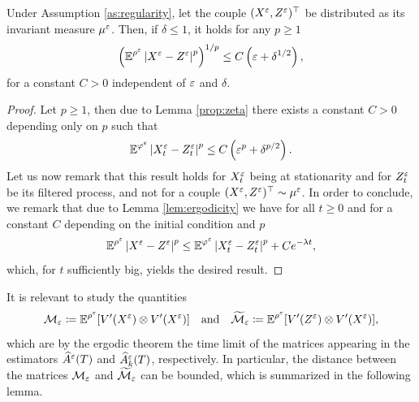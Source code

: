 \documentclass[10pt]{article}
\begin{document}
\begin{appendices}
\begin{corollary} \label{cor:distanceZandX} Under Assumption \ref{as:regularity}, let the couple $(X^\varepsilon, Z^\varepsilon)^\top$ be distributed as its invariant measure $\mu^\varepsilon$. Then, if $\delta \leq 1$, it holds for any $p \geq 1$
	\begin{equation}
	\left(\operatorname{\mathbb{E}}^{\rho^\varepsilon} \left\lvert X^\varepsilon - Z^\varepsilon\right\rvert^p\right)^{1/p} \leq C\left(\varepsilon + \delta^{1/2}\right),
	\end{equation}
	for a constant $C > 0$ independent of $\varepsilon$ and $\delta$.
\end{corollary}
\begin{proof}
	Let $p \geq 1$, then due to Lemma \ref{prop:zeta} there exists a constant $C > 0$ depending only on $p$ such that
	\begin{equation}
	\operatorname{\mathbb{E}}^{\varphi^\varepsilon}\left\lvert X_t^\varepsilon - Z_t^\varepsilon\right\rvert^p \leq C\left(\varepsilon^p + \delta^{p/2}\right).
	\end{equation}
	Let us now remark that this result holds for $X_t^\varepsilon$ being at stationarity and for $Z_t^\varepsilon$ be its filtered process, and not for a couple $(X^\varepsilon, Z^\varepsilon)^\top \sim \mu^\varepsilon$. In order to conclude, we remark that due to Lemma \ref{lem:ergodicity} we have for all $t \geq 0$ and for a constant $C$ depending on the initial condition and $p$  
	\begin{equation}
	\operatorname{\mathbb{E}}^{\rho^\varepsilon} \left\lvert X^\varepsilon - Z^\varepsilon\right\rvert^p \leq \operatorname{\mathbb{E}}^{\varphi^\varepsilon}\left\lvert X_t^\varepsilon - Z_t^\varepsilon\right\rvert^p + Ce^{-\lambda t},
	\end{equation}
	which, for $t$ sufficiently big, yields the desired result.
\end{proof}

It is relevant to study the quantities
\begin{equation}\label{eq:CalM}
\mathcal M_\varepsilon \coloneqq \operatorname{\mathbb{E}}^{\rho^\varepsilon}[V'(X^\varepsilon) \otimes V'(X^\varepsilon)] \quad \text{and} \quad \widetilde{\mathcal M}_\varepsilon \coloneqq \operatorname{\mathbb{E}}^{\rho^\varepsilon}[V'(Z^\varepsilon) \otimes V'(X^\varepsilon)],
\end{equation}
which are by the ergodic theorem the time limit of the matrices appearing in the estimators $\widehat A^\varepsilon(T)$ and $\widehat A^\varepsilon_k(T)$, respectively. In particular, the distance between the matrices $\mathcal M_\varepsilon$ and $\widetilde{\mathcal M}_\varepsilon$ can be bounded, which is summarized in the following lemma.


\end{appendices}
\end{document}
